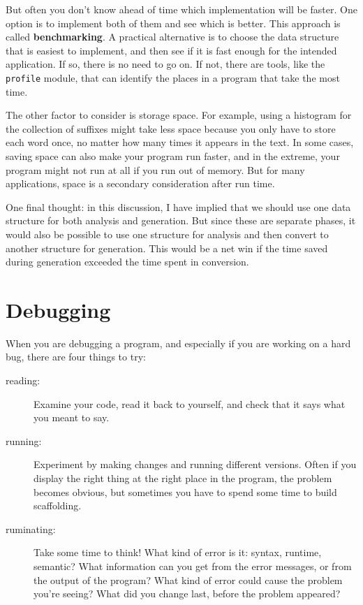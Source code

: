 \documentclass[10pt]{book}
\begin{document}
\begin{CJK}{UTF8}{gbsn}
But often you don't know ahead of time which implementation will
be faster.  One option is to implement both of them and see which
is better.  This approach is called {\bf benchmarking}.  A practical
alternative is to choose the data structure that is
easiest to implement, and then see if it is fast enough for the
intended application.  If so, there is no need to go on.  If not,
there are tools, like the {\tt profile} module, that can identify
the places in a program that take the most time.

The other factor to consider is storage space.  For example, using a
histogram for the collection of suffixes might take less space because
you only have to store each word once, no matter how many times it
appears in the text.  In some cases, saving space can also make your
program run faster, and in the extreme, your program might not run at
all if you run out of memory.  But for many applications, space is a
secondary consideration after run time.

One final thought: in this discussion, I have implied that
we should use one data structure for both analysis and generation.  But
since these are separate phases, it would also be possible to use one
structure for analysis and then convert to another structure for
generation.  This would be a net win if the time saved during
generation exceeded the time spent in conversion.


\section{Debugging}

When you are debugging a program, and especially if you are
working on a hard bug, there are four things to try:

\begin{description}

\item[reading:] Examine your code, read it back to yourself, and
check that it says what you meant to say.

\item[running:] Experiment by making changes and running different
versions.  Often if you display the right thing at the right place
in the program, the problem becomes obvious, but sometimes you have to
spend some time to build scaffolding.

\item[ruminating:] Take some time to think!  What kind of error
is it: syntax, runtime, semantic?  What information can you get from
the error messages, or from the output of the program?  What kind of
error could cause the problem you're seeing?  What did you change
last, before the problem appeared?


\end{description}
\end{CJK}
\end{document}
